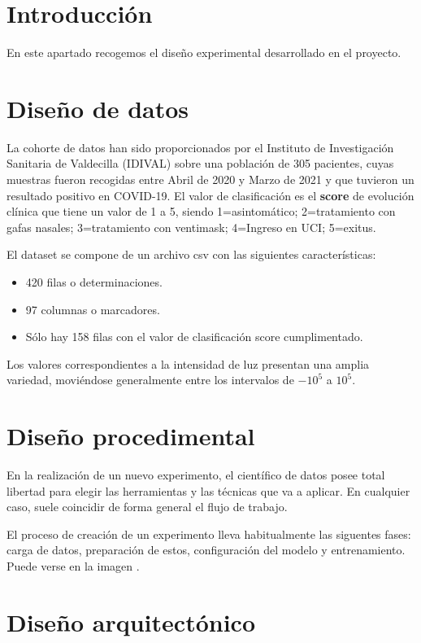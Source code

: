 
\section{Introducción}

En este apartado recogemos el diseño experimental desarrollado en el proyecto.

\section{Diseño de datos}

La cohorte de datos han sido proporcionados por el Instituto de Investigación Sanitaria de Valdecilla (IDIVAL) sobre una población de 305 pacientes, cuyas muestras fueron recogidas entre Abril de 2020 y Marzo de 2021 y que tuvieron un resultado positivo en COVID-19. El valor de clasificación es el \textbf{score} de evolución clínica que tiene un valor de 1 a 5, siendo 1=asintomático; 2=tratamiento con gafas nasales; 3=tratamiento con ventimask; 4=Ingreso en UCI; 5=exitus.

El dataset se compone de un archivo csv con las siguientes características:
\begin{itemize}
	\item 420 filas o determinaciones.
	\item 97 columnas o marcadores.
    \item Sólo hay 158 filas con el valor de clasificación score cumplimentado.
\end{itemize}

Los valores correspondientes a la intensidad de luz presentan una amplia variedad, moviéndose generalmente entre los intervalos de $-10^5$ a $10^5$. 


\section{Diseño procedimental}

En la realización de un nuevo experimento, el científico de datos posee total libertad para elegir las herramientas y las técnicas que va a aplicar. En cualquier caso, suele coincidir de forma general el flujo de trabajo.

El proceso de creación de un experimento lleva habitualmente las siguentes fases: carga de datos, preparación de estos, configuración del modelo y entrenamiento. Puede verse en la imagen .


\section{Diseño arquitectónico}